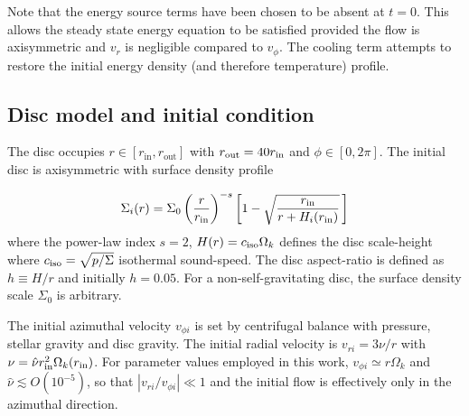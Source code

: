 Note that the energy source terms have been chosen to be absent 
at $t=0$. This allows the steady state energy equation to be satisfied
provided the flow is axisymmetric and $v_r$ is negligible compared to $v_\phi$.  
The cooling term attempts 
to restore the initial energy density (and therefore temperature) profile. 


\subsection{Disc model and initial condition}
The disc occupies $r\in[r_\mathrm{in}, r_\mathrm{out}]$ with $r_\mathrm{out} =
40r_\mathrm{in}$ and $\phi\in[0,2\pi]$. The initial disc is axisymmetric with
surface density profile  
 
\begin{align}\label{initial_density}
   \Sigma_i(r) = \Sigma_0\left(\frac{r}{r_\mathrm{in}}\right)^{-s}
    \left[1 - \sqrt{\frac{r_\mathrm{in}}{r + H_i(r_\mathrm{in})}}\,\right] 
\end{align}
where the power-law index $s=2$, $H(r) = c_\mathrm{iso}\Omega_k $ defines the disc scale-height 
where $c_\mathrm{iso}=\sqrt{p/\Sigma}$ isothermal sound-speed. The disc aspect-ratio is defined as $h\equiv H/r$ and initially
$h=0.05$. For a non-self-gravitating disc, the surface density scale
$\Sigma_0$ is arbitrary. 


The initial azimuthal velocity $v_{\phi i}$ is set by centrifugal balance with
pressure, stellar gravity and disc gravity. The initial radial velocity is $v_{r i}=3\nu/r$ 
with $\nu = \hat{\nu}r_\mathrm{in}^2\Omega_k(r_\mathrm{in})$. For parameter values employed in this work, $v_{\phi i}\simeq r\Omega_k$ 
and $\hat{\nu}\lesssim O(10^{-5})$, so that $|v_{r i}/v_{\phi i}|\ll1$ and the initial 
flow is effectively only in the azimuthal direction. 


